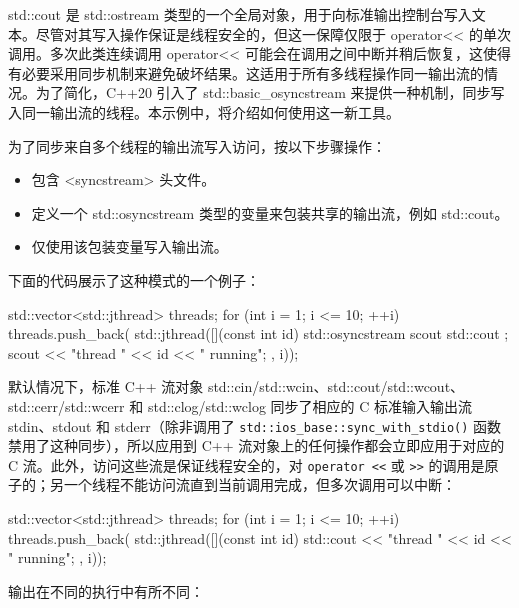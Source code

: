 
std::cout 是 std::ostream 类型的一个全局对象，用于向标准输出控制台写入文本。尽管对其写入操作保证是线程安全的，但这一保障仅限于 operator<{}< 的单次调用。多次此类连续调用 operator<{}< 可能会在调用之间中断并稍后恢复，这使得有必要采用同步机制来避免破坏结果。这适用于所有多线程操作同一输出流的情况。为了简化，C++20 引入了 std::basic\_osyncstream 来提供一种机制，同步写入同一输出流的线程。本示例中，将介绍如何使用这一新工具。


为了同步来自多个线程的输出流写入访问，按以下步骤操作：

\begin{itemize}
\item
包含 <syncstream> 头文件。

\item
定义一个 std::osyncstream 类型的变量来包装共享的输出流，例如 std::cout。

\item
仅使用该包装变量写入输出流。
\end{itemize}

下面的代码展示了这种模式的一个例子：

\begin{cpp}
std::vector<std::jthread> threads;
for (int i = 1; i <= 10; ++i)
{
    threads.push_back(
        std::jthread([](const int id)
            {
                std::osyncstream scout{ std::cout };
                scout << "thread " << id << " running\n";
            }, i));
}
\end{cpp}


默认情况下，标准 C++ 流对象 std::cin/std::wcin、std::cout/std::wcout、std::cerr/std::wcerr 和 std::clog/std::wclog 同步了相应的 C 标准输入输出流 stdin、stdout 和 stderr（除非调用了 \verb|std::ios_base::sync_with_stdio()| 函数禁用了这种同步），所以应用到 C++ 流对象上的任何操作都会立即应用于对应的 C 流。此外，访问这些流是保证线程安全的，对 \verb|operator <<| 或 \verb|>>| 的调用是原子的；另一个线程不能访问流直到当前调用完成，但多次调用可以中断：

\begin{cpp}
std::vector<std::jthread> threads;
for (int i = 1; i <= 10; ++i)
{
    threads.push_back(
        std::jthread([](const int id)
            {
                std::cout << "thread " << id << " running\n";
            }, i));
}
\end{cpp}

输出在不同的执行中有所不同：

